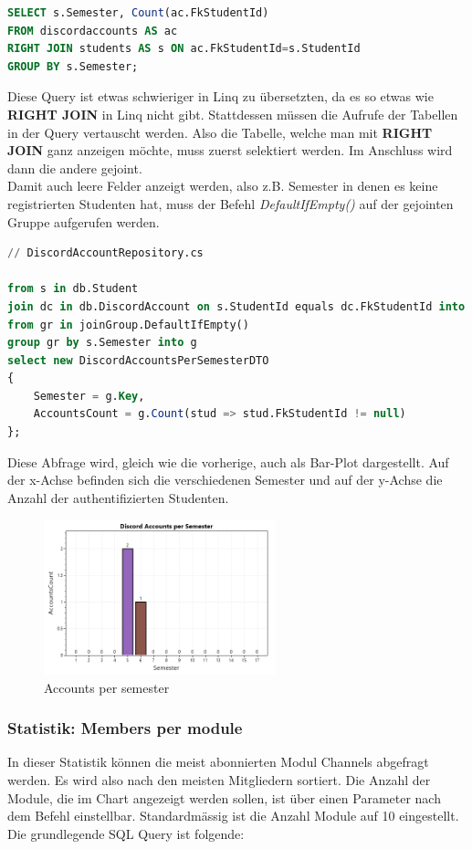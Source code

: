 \documentclass[a4paper, table]{article}
\begin{document}
\begin{lstlisting}[language=SQL]
SELECT s.Semester, Count(ac.FkStudentId)
FROM discordaccounts AS ac
RIGHT JOIN students AS s ON ac.FkStudentId=s.StudentId
GROUP BY s.Semester;
\end{lstlisting}

Diese Query ist etwas schwieriger in Linq zu übersetzten, da es so etwas wie \textbf{RIGHT JOIN} in Linq nicht gibt.
Stattdessen müssen die Aufrufe der Tabellen in der Query vertauscht werden.
Also die Tabelle, welche man mit \textbf{RIGHT JOIN} ganz anzeigen möchte, muss zuerst selektiert werden.
Im Anschluss wird dann die andere gejoint.\\
Damit auch leere Felder anzeigt werden, also z.B. Semester in denen es keine registrierten Studenten hat, 
muss der Befehl \textit{DefaultIfEmpty()} auf der gejointen Gruppe aufgerufen werden.

\begin{lstlisting}[language=SQL]
// DiscordAccountRepository.cs

from s in db.Student
join dc in db.DiscordAccount on s.StudentId equals dc.FkStudentId into joinGroup
from gr in joinGroup.DefaultIfEmpty()
group gr by s.Semester into g
select new DiscordAccountsPerSemesterDTO
{
    Semester = g.Key,
    AccountsCount = g.Count(stud => stud.FkStudentId != null)
};
\end{lstlisting}

Diese Abfrage wird, gleich wie die vorherige, auch als Bar-Plot dargestellt. 
Auf der x-Achse befinden sich die verschiedenen Semester und auf der y-Achse die Anzahl der authentifizierten Studenten.

\begin{figure}[h]
    \centering
    \includegraphics[width=0.6\textwidth]{img/accountsPerSemester.png}
    \caption{Accounts per semester}
    \label{fig:accounts-per-semester}
\end{figure}

\clearpage
\subsubsection*{Statistik: Members per module}
In dieser Statistik können die meist abonnierten Modul Channels abgefragt werden.
Es wird also nach den meisten Mitgliedern sortiert. 
Die Anzahl der Module, die im Chart angezeigt werden sollen, ist über einen Parameter nach dem Befehl einstellbar.
Standardmässig ist die Anzahl Module auf 10 eingestellt.\\
Die grundlegende SQL Query ist folgende:
\end{document}

